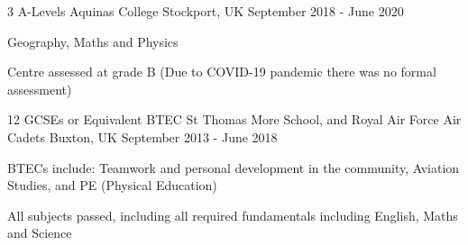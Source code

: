 \begin{cventries}
  \cventry
    {3 A-Levels} %
    {Aquinas College} %
    {Stockport, UK} %
    {September 2018 - June 2020} %
    {
      \begin{cvitems} %
        \item {Geography, Maths and Physics}
        \item {Centre assessed at grade B (Due to COVID-19 pandemic there was no formal assessment)}
      \end{cvitems}
    }

    \cventry
        {12 GCSEs or Equivalent BTEC} %
        {St Thomas More School, and Royal Air Force Air Cadets} %
        {Buxton, UK} %
        {September 2013 - June 2018}
    {
      \begin{cvitems} %
        \item {BTECs include: Teamwork and personal development in the community, Aviation Studies, and PE (Physical Education)}
        \item {All subjects passed, including all required fundamentals including English, Maths and Science}
      \end{cvitems}
    }
        
\end{cventries}
